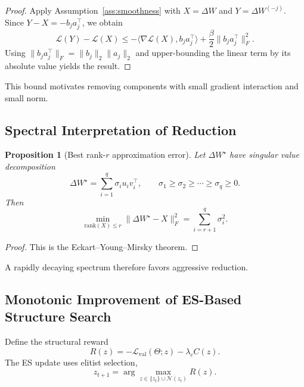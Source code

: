 \documentclass{article}
\newtheorem{proposition}{Proposition}
\begin{document}
\begin{proof}
Apply Assumption~\ref{ass:smoothness} with $X = \Delta W$ and $Y = \Delta W^{(-j)}$. Since $Y-X = -b_j a_j^\top$, we obtain
\begin{equation}
    \mathcal{L}(Y) - \mathcal{L}(X)
    \le
    -\langle \nabla\mathcal{L}(X), b_j a_j^\top \rangle
    + \frac{\beta}{2}\|b_j a_j^\top\|_F^2.
\end{equation}
Using $\|b_j a_j^\top\|_F = \|b_j\|_2\|a_j\|_2$ and upper-bounding the linear term by its absolute value yields the result.
\end{proof}

This bound motivates removing components with small gradient interaction and small norm.

\subsection{Spectral Interpretation of Reduction}
\begin{proposition}[Best rank-$r$ approximation error]
\label{prop:eckart_young}
Let $\Delta W^\star$ have singular value decomposition
\begin{equation}
    \Delta W^\star = \sum_{i=1}^{q} \sigma_i u_i v_i^\top,
    \qquad \sigma_1 \ge \sigma_2 \ge \cdots \ge \sigma_q \ge 0.
\end{equation}
Then
\begin{equation}
    \min_{\mathrm{rank}(X) \le r} \|\Delta W^\star - X\|_F^2
    = \sum_{i=r+1}^{q} \sigma_i^2.
\end{equation}
\end{proposition}

\begin{proof}
This is the Eckart--Young--Mirsky theorem.
\end{proof}

A rapidly decaying spectrum therefore favors aggressive reduction.

\subsection{Monotonic Improvement of ES-Based Structure Search}
Define the structural reward
\begin{equation}
    R(z) = -\mathcal{L}_{\mathrm{val}}(\Theta; z) - \lambda_c C(z).
\end{equation}
The ES update uses elitist selection,
\begin{equation}
    z_{t+1} = \arg\max_{z \in \{z_t\}\cup\mathcal{N}(z_t)} R(z).
\end{equation}
\end{document}
